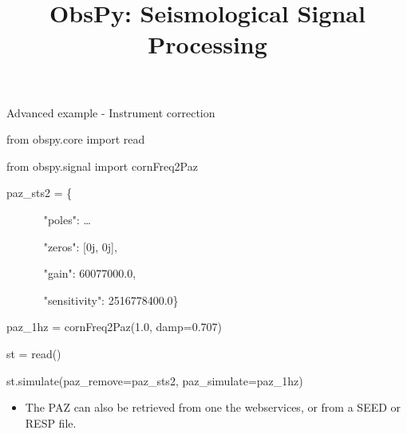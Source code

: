 
\title{ObsPy: Seismological Signal Processing}



\frame[plain]{\titlepage}


\begin{frame}[plain]{Advanced example - Instrument correction}

\begin{myColorBox}{0.95}{}
\begin{semiverbatim}
from obspy.core import read

from obspy.signal import cornFreq2Paz

paz\_sts2 = \{

~ ~ ~ ~ "poles": \dots

~ ~ ~ ~ "zeros": [0j, 0j],

~ ~ ~ ~ "gain": 60077000.0,

~ ~ ~ ~ "sensitivity": 2516778400.0\}

paz\_1hz = cornFreq2Paz(1.0, damp=0.707)

st = read()

st.simulate(paz\_remove=paz\_sts2, paz\_simulate=paz\_1hz)

\end{semiverbatim}
\end{myColorBox}

\begin{itemize}
    \item The PAZ can also be retrieved from one the webservices, or from a SEED or RESP file.
\end{itemize}


\end{frame}



